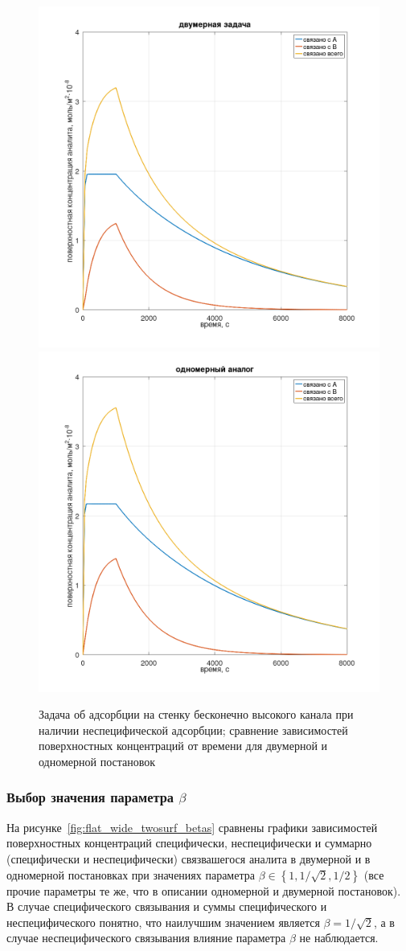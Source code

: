 \documentclass[oneside,final,12pt]{extreport}
\begin{document}
\begin{figure}
  \centering
  \includegraphics[width=.5\textwidth]{pic/flat_wide_twosurf_plane_abs}%
  \includegraphics[width=.5\textwidth]{pic/flat_wide_twosurf_onedim_abs}

  \caption{%
    \label{fig:flat_wide_two_surf_oneplate}%
    Задача об адсорбции на стенку бесконечно высокого канала
    при наличии неспецифической адсорбции;
    сравнение зависимостей поверхностных концентраций от времени
    для двумерной и одномерной постановок
  }

\end{figure}

\subsubsection*{Выбор значения параметра $\beta$}

На рисунке~\ref{fig:flat_wide_twosurf_betas} сравнены
графики зависимостей поверхностных концентраций специфически, неспецифически и
суммарно (специфически и неспецифически) связвашегося аналита
в двумерной и в одномерной постановках при значениях параметра
$\beta \in \left\{1,1/\sqrt{2},1/2\right\}$
(все прочие параметры те же, что в описании одномерной и двумерной постановок).
В случае специфического связывания и суммы специфического и неспецифического
понятно, что наилучшим значением является $\beta = 1/\sqrt{2}$,
а в случае неспецифического связывания влияние параметра $\beta$ не наблюдается.
\end{document}
